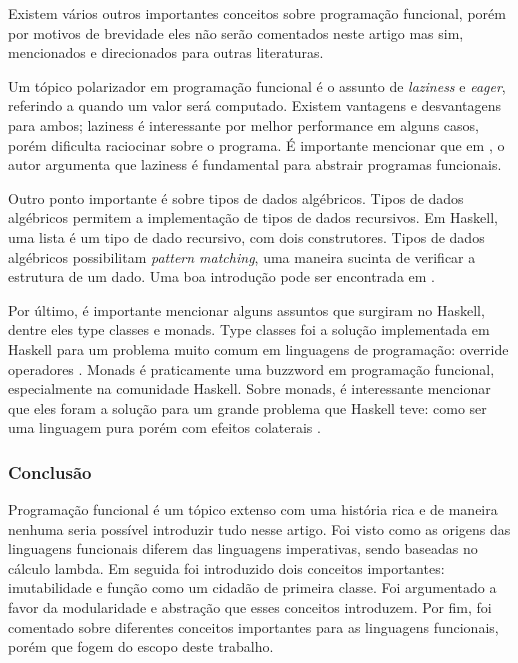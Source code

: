 Existem vários outros importantes conceitos sobre programação funcional, porém por motivos de brevidade eles não serão comentados neste artigo mas sim, mencionados e direcionados para outras literaturas.

Um tópico polarizador em programação funcional é o assunto de \emph{laziness} e \emph{eager}, referindo a quando um valor será computado.
Existem vantagens e desvantagens para ambos; laziness é interessante por melhor performance em alguns casos, porém dificulta raciocinar sobre o programa.
É importante mencionar que em \cite{whyfpm}, o autor argumenta que laziness é fundamental para abstrair programas funcionais.

Outro ponto importante é sobre tipos de dados algébricos.
Tipos de dados algébricos permitem a implementação de tipos de dados recursivos.
Em Haskell, uma lista é um tipo de dado recursivo, com dois construtores.
Tipos de dados algébricos possibilitam \emph{pattern matching}, uma maneira sucinta de verificar a estrutura de um dado.
Uma boa introdução pode ser encontrada em \cite{lipovaca}.

Por último, é importante mencionar alguns assuntos que surgiram no Haskell, dentre eles type classes e monads.
Type classes foi a solução implementada em Haskell para um problema muito comum em linguagens de programação: override operadores \cite{haskell-ivory}.
Monads é praticamente uma buzzword em programação funcional, especialmente na comunidade Haskell.
Sobre monads, é interessante mencionar que eles foram a solução para um grande problema que Haskell teve: como ser uma linguagem pura porém com efeitos colaterais \cite{haskell-ivory}.

\subsubsection{Conclusão}

Programação funcional é um tópico extenso com uma história rica e de maneira nenhuma seria possível introduzir tudo nesse artigo.
Foi visto como as origens das linguagens funcionais diferem das linguagens imperativas, sendo baseadas no cálculo lambda.
Em seguida foi introduzido dois conceitos importantes: imutabilidade e função como um cidadão de primeira classe.
Foi argumentado a favor da modularidade e abstração que esses conceitos introduzem.
Por fim, foi comentado sobre diferentes conceitos importantes para as linguagens funcionais, porém que fogem do escopo deste trabalho.



